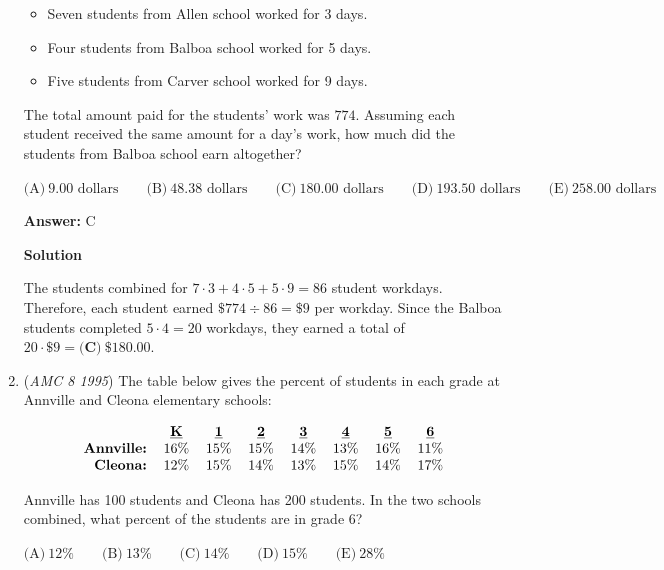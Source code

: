 \begin{enumerate}
 
            \begin{itemize}
        \item Seven students from Allen school worked for 3 days.

        \item Four students from Balboa school worked for 5 days.

        \item Five students from Carver school worked for 9 days.
            \end{itemize}
            The total amount paid for the students' work was $774$.  Assuming each student received the same amount for a day's work, how much did the students from Balboa school earn altogether?


 $\text{(A)}\ 9.00\text{ dollars} \qquad \text{(B)}\ 48.38\text{ dollars} \qquad \text{(C)}\ 180.00\text{ dollars} \qquad \text{(D)}\ 193.50\text{ dollars} \qquad \text{(E)}\ 258.00\text{ dollars}$

 \textbf{Answer: }C



\textbf{Solution}

The students combined for $7\cdot 3 + 4 \cdot 5 + 5 \cdot 9 = 86$ student workdays.  Therefore, each student earned $\$774 \div 86 = \$9$ per workday.  Since the Balboa students completed $5 \cdot 4 = 20$ workdays, they earned a total of $20 \cdot \$9 = \boxed{\textbf{(C)}\ \$180.00}$. 

 


	\item (\textit{AMC 8 1995}) The table below gives the percent of students in each grade at Annville and Cleona elementary schools:


 
 \[\begin{tabular}{rccccccc}  & \textbf{\underline{K}} & \textbf{\underline{1}} & \textbf{\underline{2}} & \textbf{\underline{3}} & \textbf{\underline{4}} & \textbf{\underline{5}} & \textbf{\underline{6}} \\ \textbf{Annville:} & 16\% & 15\% & 15\% & 14\% & 13\% & 16\% & 11\% \\ \textbf{Cleona:} & 12\% & 15\% & 14\% & 13\% & 15\% & 14\% & 17\%  \end{tabular}\]


 Annville has 100 students and Cleona has 200 students.  In the two schools combined, what percent of the students are in grade 6?


 $\text{(A)}\ 12\% \qquad \text{(B)}\ 13\% \qquad \text{(C)}\ 14\% \qquad \text{(D)}\ 15\% \qquad \text{(E)}\ 28\%$


\end{enumerate}

